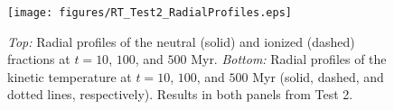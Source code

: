 \documentclass[preprint2]{aastex}              %
\begin{document}
\begin{figure}[htbp]
\centering
\texttt{[image: figures/RT\_Test2\_RadialProfiles.eps]}
\caption{\textit{Top:} Radial profiles of the neutral (solid) and ionized (dashed) fractions at $t = 10$, $100$, and $500$ Myr. \textit{Bottom:} Radial profiles of the kinetic temperature at $t = 10$, $100$, and $500$ Myr (solid, dashed, and dotted lines, respectively).  Results in both panels from Test 2.}
\label{fig:RT_Test2_RadialProfiles}
\end{figure}
\end{document}
